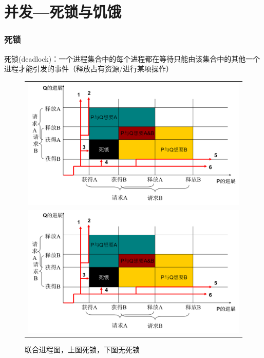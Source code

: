 
\section{并发---死锁与饥饿}
\subsubsection{死锁}
死锁(deadlock)：一个进程集合中的每个进程都在等待只能由该集合中的其他一个进程才能引发的事件（释放占有资源/进行某项操作）
\begin{figure}[H]
    \centering
    \begin{tabular}{c}
    \includegraphics[width=0.8\linewidth]{fig/deadlock.png}\\
    \includegraphics[width=0.8\linewidth]{fig/deadlock.png}
    \end{tabular}
    \caption*{联合进程图，上图死锁，下图无死锁}
\end{figure}

